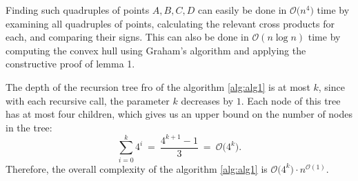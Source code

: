 \documentclass[12pt]{article}
\begin{document}
	Finding such quadruples of points \(A, B, C, D\) can easily be done in
	\(\mathcal{O} \big( n^{4} \big)\) time by examining all quadruples of
	points, calculating the relevant cross products for each, and comparing
	their signs. This can also be done in \(\mathcal{O} (n \log n)\) time by
	computing the convex hull using Graham's algorithm and applying the
	constructive proof of lemma 1.
	
	\medskip
	
	The depth of the recursion tree fro of the algorithm \ref{alg:alg1} is at
	most \(k\), since with each recursive call, the parameter \(k\) decreases
	by \(1\). Each node of this tree has at most four children, which gives us
	an upper bound on the number of nodes in the tree:
	\[ \sum\limits_{i = 0}^{k} 4^{i} \ = \ \frac{4^{k + 1} - 1}{3} \ = \
	\mathcal{O} \big( 4^{k} \big) \text{.} \]
	Therefore, the overall complexity of the algorithm \ref{alg:alg1} is
	\(\mathcal{O} \big( 4^{k} \big) \cdot n^{\mathcal{O}(1)}\).
\end{document}
